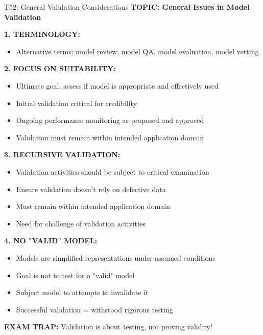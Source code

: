 \documentclass[8pt]{beamer}
\begin{document}
	\begin{frame}{T52: General Validation Considerations}
		\fontsize{6.5}{7.5}\selectfont
		\textbf{TOPIC: General Issues in Model Validation}
		
		\vspace{0.1cm}
		\textbf{1. TERMINOLOGY:}
		\begin{itemize}
			\item Alternative terms: model review, model QA, model evaluation, model vetting
		\end{itemize}
		
		\vspace{0.1cm}
		\textbf{2. FOCUS ON SUITABILITY:}
		\begin{itemize}
			\item Ultimate goal: assess if model is appropriate and effectively used
			\item Initial validation critical for credibility
			\item Ongoing performance monitoring as proposed and approved
			\item Validation must remain within intended application domain
		\end{itemize}
		
		\vspace{0.1cm}
		\textbf{3. RECURSIVE VALIDATION:}
		\begin{itemize}
			\item Validation activities should be subject to critical examination
			\item Ensure validation doesn't rely on defective data
			\item Must remain within intended application domain
			\item Need for challenge of validation activities
		\end{itemize}
		
		\vspace{0.1cm}
		\textbf{4. NO "VALID" MODEL:}
		\begin{itemize}
			\item Models are simplified representations under assumed conditions
			\item Goal is not to test for a "valid" model
			\item Subject model to attempts to invalidate it
			\item Successful validation = withstood rigorous testing
		\end{itemize}
		
		\textcolor{myred}{\textbf{EXAM TRAP:}} Validation is about \textcolor{myblue}{testing, not proving validity}!
	\end{frame}
	
\end{document}
